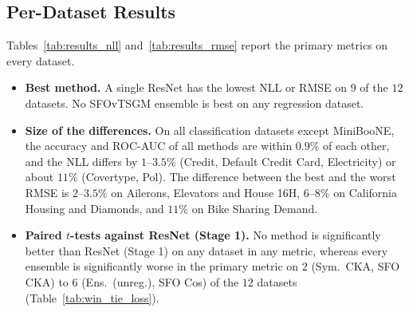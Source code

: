 \documentclass[11pt, a4paper]{article}
\begin{document}
\subsection{Per-Dataset Results}
Tables~\ref{tab:results_nll} and~\ref{tab:results_rmse} report the primary metrics on every dataset.
\begin{itemize}
    \item \textbf{Best method.} A single ResNet has the lowest NLL or RMSE on $9$ of the $12$ datasets. No SFOvTSGM ensemble is best on any regression dataset.
    \item \textbf{Size of the differences.} On all classification datasets except MiniBooNE, the accuracy and ROC-AUC of all methods are within $0.9\%$ of each other, and the NLL differs by $1$--$3.5\%$ (Credit, Default Credit Card, Electricity) or about $11\%$ (Covertype, Pol). The difference between the best and the worst RMSE is $2$--$3.5\%$ on Ailerons, Elevators and House 16H, $6$--$8\%$ on California Housing and Diamonds, and $11\%$ on Bike Sharing Demand.
    \item \textbf{Paired $t$-tests against ResNet (Stage 1).} No method is significantly better than ResNet (Stage 1) on any dataset in any metric, whereas every ensemble is significantly worse in the primary metric on $2$ (Sym.\ CKA, SFO CKA) to $6$ (Ens.\ (unreg.), SFO Cos) of the $12$ datasets (Table~\ref{tab:win_tie_loss}).
\end{itemize}



\end{document}
